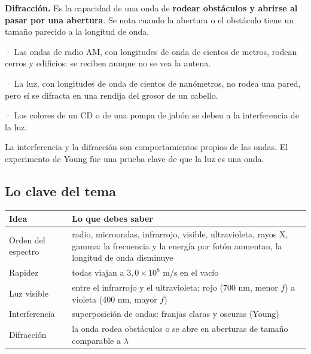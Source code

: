  

\textbf{Difracción.} Es la capacidad de una onda de \textbf{rodear obstáculos y abrirse al pasar por una abertura}. Se nota cuando la abertura o el obstáculo tiene un tamaño parecido a la longitud de onda.

  
\begin{ejemplo}[{Ejemplos}] · Las ondas de radio AM, con longitudes de onda de cientos de metros, rodean cerros y edificios: se reciben aunque no se vea la antena.\par · La luz, con longitudes de onda de cientos de nanómetros, no rodea una pared, pero sí se difracta en una rendija del grosor de un cabello.\par · Los colores de un CD o de una pompa de jabón se deben a la interferencia de la luz.\end{ejemplo}
 
\begin{clave}[{Recuerda}] La interferencia y la difracción son comportamientos propios de las ondas. El experimento de Young fue una prueba clave de que la luz es una onda.\end{clave}
\subsection{Lo clave del tema}
\begin{center}\small
\begin{tabularx}{\linewidth}{@{}>{\raggedright\arraybackslash\hsize=0.62\hsize}X>{\raggedright\arraybackslash\hsize=1.38\hsize}X@{}}
\toprule
\textbf{Idea} & \textbf{Lo que debes saber} \\
\midrule
Orden del espectro & radio, microondas, infrarrojo, visible, ultravioleta, rayos X, gamma: la frecuencia y la energía por fotón aumentan, la longitud de onda disminuye \\
Rapidez & todas viajan a $3{,}0\times10^{8}$ m/s en el vacío \\
Luz visible & entre el infrarrojo y el ultravioleta; rojo (700 nm, menor $f$) a violeta (400 nm, mayor $f$) \\
Interferencia & superposición de ondas: franjas claras y oscuras (Young) \\
Difracción & la onda rodea obstáculos o se abre en aberturas de tamaño comparable a $\lambda$ \\
\bottomrule
\end{tabularx}
\end{center}
 
